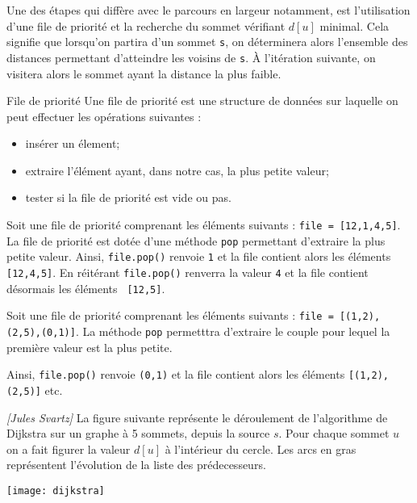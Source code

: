 Une des étapes qui diffère avec le parcours en largeur notamment, est l'utilisation d'une file de priorité et la recherche du sommet vérifiant $d[u]$ minimal. Cela signifie que lorsqu'on partira d'un sommet \texttt{s}, on déterminera alors l'ensemble des distances permettant d'atteindre les voisins de \texttt{s}. \`A l'itération suivante, on visitera alors le sommet ayant la distance la plus faible.

\begin{defi}{File de priorité}
Une file de priorité est une structure de données sur laquelle on peut effectuer les opérations suivantes : 
\begin{itemize}
\item insérer un élement;
\item extraire l'élément ayant, dans notre cas, la plus petite valeur;
\item tester si la file de priorité est vide ou pas.
\end{itemize}

\end{defi}

\begin{exemple}
Soit une file de priorité comprenant les éléments suivants : \texttt{file = [12,1,4,5]}. La file de priorité est dotée d'une méthode \texttt{pop} permettant d'extraire la plus petite valeur. 
Ainsi, \texttt{file.pop()} renvoie \texttt{1} et la file contient alors les éléments \texttt{ [12,4,5]}. 
En réitérant \texttt{file.pop()} renverra la valeur \texttt{4} et la file contient désormais  les éléments \texttt{ [12,5]}.


Soit une file de priorité comprenant les éléments suivants : \texttt{file = [(1,2),(2,5),(0,1)]}. La méthode \texttt{pop} permetttra d'extraire le couple pour lequel la première valeur est la plus petite. 

Ainsi, \texttt{file.pop()} renvoie \texttt{(0,1)} et la file contient alors les éléments \texttt{[(1,2),(2,5)]} etc.

\end{exemple}


\begin{exemple} \textit{[Jules Svartz]} 
La figure suivante représente le déroulement de l’algorithme de Dijkstra sur un graphe à 5 sommets, depuis 
la source $s$. Pour chaque sommet $u$ on a fait figurer la valeur $d[u]$ à l’intérieur du cercle. Les arcs en gras représentent
l’évolution de la liste des prédecesseurs.

\begin{center}
\texttt{[image: dijkstra]}
\end{center}
\end{exemple}

